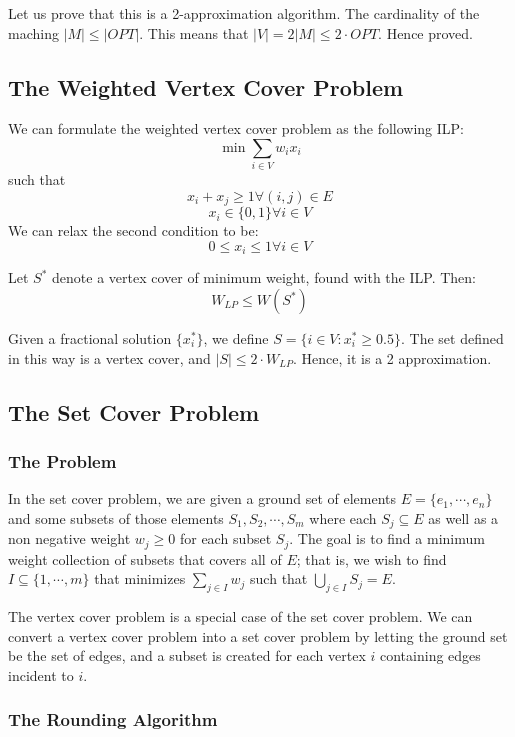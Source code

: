 \documentclass[12pt,letterpaper]{article}
\theoremstyle{definition}
\begin{document}
Let us prove that this is a 2-approximation algorithm. The cardinality of the maching $|M| \leq |OPT|$. This means that $|V| = 2|M| \leq 2 \cdot OPT$. Hence proved.

\subsection{The Weighted Vertex Cover Problem}

We can formulate the weighted vertex cover problem as the following ILP:
\[\min \sum_{i \in V} w_i x_i\]
such that
\[x_i + x_j \geq 1 \forall (i,j) \in E\]
\[x_i \in \{0,1\} \forall i \in V\]
We can relax the second condition to be:
\[0 \leq x_i \leq 1 \forall i \in V\]

Let $S^*$ denote a vertex cover of minimum weight, found with the ILP. Then:
\[W_{LP} \leq W(S^*)\]

Given a fractional solution $\{x_i^*\}$, we define $S = \{i \in V : x_i^* \geq 0.5\}$. The set defined in this way is a vertex cover, and $|S| \leq 2 \cdot W_{LP}$. Hence, it is a 2 approximation.

\subsection{The Set Cover Problem}

\subsubsection{The Problem}

In the set cover problem, we are given a ground set of elements $E = \{e_1, \cdots, e_n\}$ and some subsets of those elements $S_1, S_2, \cdots, S_m$ where each $S_j \subseteq E$ as well as a non negative weight $w_j \geq 0$ for each subset $S_j$. The goal is to find a minimum weight collection of subsets that covers all of $E$; that is, we wish to find $I \subseteq \{1, \cdots, m\}$ that minimizes $\sum_{j \in I} w_j$ such that $\bigcup_{j \in I}S_j = E$.

The vertex cover problem is a special case of the set cover problem. We can convert a vertex cover problem into a set cover problem by letting the ground set be the set of edges, and a subset is created for each vertex $i$ containing edges incident to $i$.

\subsubsection{The Rounding Algorithm}
\end{document}
